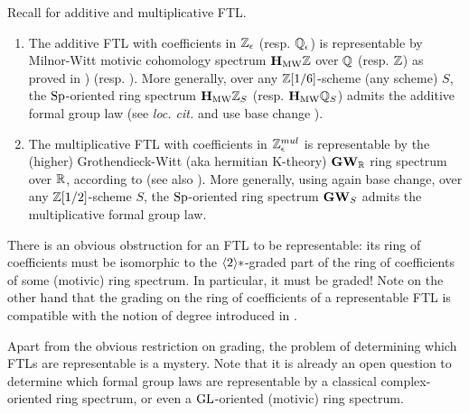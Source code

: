 \begin{ex}\label{ex:representableFTL}
Recall  for additive and multiplicative FTL.
\begin{enumerate}
\item The additive FTL with coefficients in $\mathbb{Z}_\epsilon$ (resp. $\mathbb{Q}_\epsilon$) is representable
 by Milnor-Witt motivic cohomology spectrum $\mathbf{H}_\mathrm{MW} \mathbb{Z}$ over $\mathbb{Q}$ (resp. $\mathbb{Z}$)
 as proved in \cite[Th. 3.3.2]{DF3}) (resp. \cite[Cor. 3.3.5]{DF3}).
 More generally, over any $\mathbb{Z}[1/6]$-scheme (any scheme) $S$, the $\mathrm{Sp}$-oriented ring spectrum $\mathbf{H}_\mathrm{MW}\mathbb{Z}_S$
 (resp. $\mathbf{H}_\mathrm{MW}\mathbb{Q}_S$) admits the additive formal group law (see \emph{loc. cit.} and use base change
 ).
\item The multiplicative FTL with coefficients in $\mathbb{Z}_\epsilon^{mul}$
 is representable by the (higher) Grothendieck-Witt (aka hermitian K-theory) $\mathbf{GW}_{\mathbb{R}}$ ring spectrum
 over $\mathbb{R}$, according to \cite[Th. 6.6]{FH21} (see also \cite[]{CDFH}).
 More generally, using again base change, over any $\mathbb{Z}[1/2]$-scheme $S$,
 the $\mathrm{Sp}$-oriented ring spectrum $\mathbf{GW}_S$ admits the multiplicative formal group law.
\end{enumerate}
\end{ex}

\begin{rem}
There is an obvious obstruction for an FTL to be representable:
 its ring of coefficients must be isomorphic to the $\langle 2 \rangle*$-graded part of the
 ring of coefficients of some (motivic) ring spectrum. In particular, it must be graded!
 Note on the other hand that the grading on the ring of coefficients
 of a representable FTL is compatible with the notion of degree 
 introduced in .

Apart from the obvious restriction on grading,
 the problem of determining which FTLs are representable is a mystery.
 Note that it is already an open question to determine which formal group laws
 are representable by a classical complex-oriented ring spectrum, or
 even a $\mathrm{GL}$-oriented (motivic) ring spectrum.
\end{rem}

